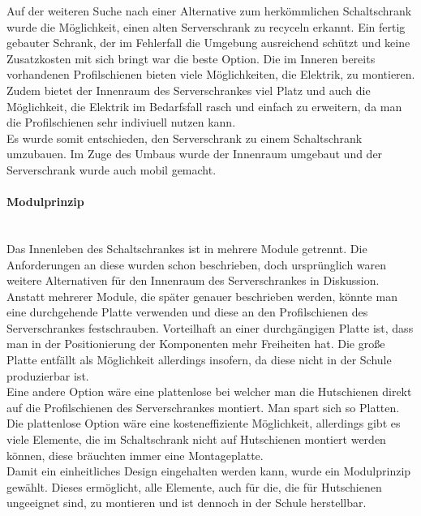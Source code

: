     Auf der weiteren Suche nach einer Alternative zum herkömmlichen Schaltschrank wurde die Möglichkeit, einen alten Serverschrank zu recyceln erkannt. Ein fertig gebauter Schrank, der im Fehlerfall die Umgebung ausreichend schützt und keine Zusatzkosten mit sich bringt war die beste Option. Die im Inneren bereits vorhandenen Profilschienen bieten viele Möglichkeiten, die Elektrik, zu montieren. Zudem bietet der Innenraum des Serverschrankes viel Platz und auch die Möglichkeit, die Elektrik im Bedarfsfall rasch und einfach zu erweitern, da man die Profilschienen sehr indiviuell nutzen kann.\\
    Es wurde somit entschieden, den Serverschrank zu einem Schaltschrank umzubauen. Im Zuge des Umbaus wurde der Innenraum umgebaut und der Serverschrank wurde auch mobil gemacht. 
    \paragraph{Modulprinzip}\mbox{}\\
    Das Innenleben des Schaltschrankes ist in mehrere Module getrennt. Die Anforderungen an diese wurden schon beschrieben, doch ursprünglich waren weitere Alternativen für den Innenraum des Serverschrankes in Diskussion.\\
    Anstatt mehrerer Module, die später genauer beschrieben werden, könnte man eine durchgehende Platte verwenden und diese an den Profilschienen des Serverschrankes festschrauben. Vorteilhaft an einer durchgängigen Platte ist, dass man in der Positionierung der Komponenten mehr Freiheiten hat. Die große Platte entfällt als Möglichkeit allerdings insofern, da diese nicht in der Schule produzierbar ist.\\
    Eine andere Option wäre eine plattenlose bei welcher man die Hutschienen direkt auf die Profilschienen des Serverschrankes montiert. Man spart sich so Platten. Die plattenlose Option wäre eine kosteneffiziente Möglichkeit, allerdings gibt es viele Elemente, die im Schaltschrank nicht auf Hutschienen montiert werden können, diese bräuchten immer eine Montageplatte.\\
    Damit ein einheitliches Design eingehalten werden kann, wurde ein Modulprinzip gewählt. Dieses ermöglicht, alle Elemente, auch für die, die für Hutschienen ungeeignet sind, zu montieren und ist dennoch in der Schule herstellbar.

